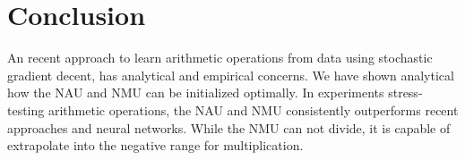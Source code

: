 \section{Conclusion}

An recent approach to learn arithmetic operations from data using stochastic gradient decent, has analytical and empirical concerns.
We have shown analytical how the NAU and NMU can be initialized optimally. In experiments stress-testing arithmetic operations, the NAU and NMU consistently outperforms recent approaches and neural networks.
While the NMU can not divide, it is capable of extrapolate into the negative range for multiplication.


